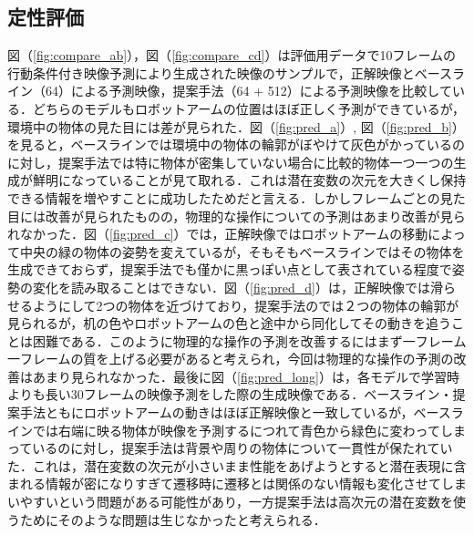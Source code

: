 \subsection{定性評価}
図（\ref{fig:compare_ab}），図（\ref{fig:compare_cd}）は評価用データで10フレームの行動条件付き映像予測により生成された映像のサンプルで，正解映像とベースライン（64）による予測映像，提案手法（64 + 512）による予測映像を比較している．どちらのモデルもロボットアームの位置はほぼ正しく予測ができているが，環境中の物体の見た目には差が見られた．図（\ref{fig:pred_a}）, 図（\ref{fig:pred_b}）を見ると，ベースラインでは環境中の物体の輪郭がぼやけて灰色がかっているのに対し，提案手法では特に物体が密集していない場合に比較的物体一つ一つの生成が鮮明になっていることが見て取れる．これは潜在変数の次元を大きくし保持できる情報を増やすことに成功したためだと言える．しかしフレームごとの見た目には改善が見られたものの，物理的な操作についての予測はあまり改善が見られなかった．図（\ref{fig:pred_c}）では，正解映像ではロボットアームの移動によって中央の緑の物体の姿勢を変えているが，そもそもベースラインではその物体を生成できておらず，提案手法でも僅かに黒っぽい点として表されている程度で姿勢の変化を読み取ることはできない．図（\ref{fig:pred_d}）は，正解映像では滑らせるようにして2つの物体を近づけており，提案手法のでは２つの物体の輪郭が見られるが，机の色やロボットアームの色と途中から同化してその動きを追うことは困難である．このように物理的な操作の予測を改善するにはまず一フレーム一フレームの質を上げる必要があると考えられ，今回は物理的な操作の予測の改善はあまり見られなかった．最後に図（\ref{fig:pred_long}）は，各モデルで学習時よりも長い30フレームの映像予測をした際の生成映像である．ベースライン・提案手法ともにロボットアームの動きはほぼ正解映像と一致しているが，ベースラインでは右端に映る物体が映像を予測するにつれて青色から緑色に変わってしまっているのに対し，提案手法は背景や周りの物体について一貫性が保たれていた．これは，潜在変数の次元が小さいまま性能をあげようとすると潜在表現に含まれる情報が密になりすぎて遷移時に遷移とは関係のない情報も変化させてしまいやすいという問題がある可能性があり，一方提案手法は高次元の潜在変数を使うためにそのような問題は生じなかったと考えられる．



